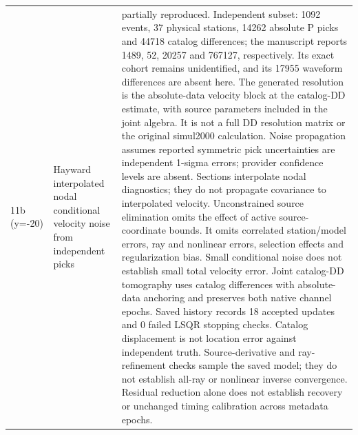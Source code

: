\begin{longtable}{>{\raggedright\arraybackslash}p{}>{\raggedright\arraybackslash}p{}>{\raggedright\arraybackslash}p{}}
11b (y=-20) & Hayward interpolated nodal conditional velocity noise from independent picks & partially reproduced. Independent subset: 1092 events, 37 physical stations, 14262 absolute P picks and 44718 catalog differences; the manuscript reports 1489, 52, 20257 and 767127, respectively. Its exact cohort remains unidentified, and its 17955 waveform differences are absent here. The generated resolution is the absolute-data velocity block at the catalog-DD estimate, with source parameters included in the joint algebra. It is not a full DD resolution matrix or the original simul2000 calculation. Noise propagation assumes reported symmetric pick uncertainties are independent 1-sigma errors; provider confidence levels are absent. Sections interpolate nodal diagnostics; they do not propagate covariance to interpolated velocity. Unconstrained source elimination omits the effect of active source-coordinate bounds. It omits correlated station/model errors, ray and nonlinear errors, selection effects and regularization bias. Small conditional noise does not establish small total velocity error. Joint catalog-DD tomography uses catalog differences with absolute-data anchoring and preserves both native channel epochs. Saved history records 18 accepted updates and 0 failed LSQR stopping checks. Catalog displacement is not location error against independent truth. Source-derivative and ray-refinement checks sample the saved model; they do not establish all-ray or nonlinear inverse convergence. Residual reduction alone does not establish recovery or unchanged timing calibration across metadata epochs.\\

\end{longtable}
